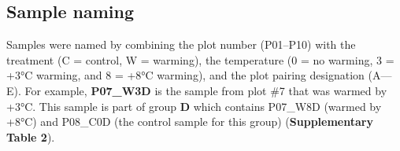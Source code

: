 \documentclass[
  10pt,
  letterpaper,
  DIV=11,
  numbers=noendperiod]{scrartcl}
\begin{document}
\hypertarget{sample-naming}{%
\subsection{Sample naming}\label{sample-naming}}

Samples were named by combining the plot number (P01--P10) with the
treatment (C = control, W = warming), the temperature (0 = no warming, 3
= +3°C warming, and 8 = +8°C warming), and the plot pairing designation
(A---E). For example, \textbf{P07\_W3D} is the sample from plot \#7 that
was warmed by +3°C. This sample is part of group \textbf{D} which
contains P07\_W8D (warmed by +8°C) and P08\_C0D (the control sample for
this group) (\textbf{Supplementary Table 2}).

\begin{table}[H]


\end{table}
\end{document}
